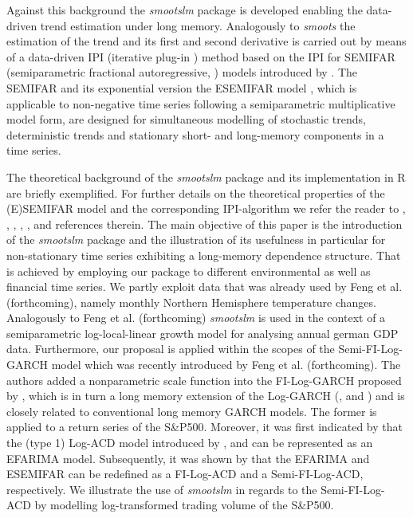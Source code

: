 \documentclass[12pt]{article}
\begin{document}
Against this background the \textit{smootslm} package is developed enabling the data-driven trend estimation under long memory. Analogously to \textit{smoots} the estimation of the trend and its first and second derivative is carried out by means of a data-driven IPI (iterative plug-in \cite{gasser1991flexible}) method based on the IPI for SEMIFAR (semiparametric fractional autoregressive, \cite{beran2002semifar}) models introduced by \citet{beran2002iterative}. The SEMIFAR and its exponential version the ESEMIFAR model \citep{beran2015modelling}, which is applicable to non-negative time series following a semiparametric multiplicative model form, are designed for simultaneous modelling of stochastic trends, deterministic trends and stationary short- and long-memory components in a time series.

The theoretical background of the \textit{smootslm} package and its implementation in R are briefly exemplified. For further details on the theoretical properties of the (E)SEMIFAR model and the corresponding IPI-algorithm we refer the reader to \citet{beran1999semifar}, \citet{beran2002semifar}, \citet{beran2002iterative}, \citet{beran2002local}, \citet{beran2015modelling}, \citet{beran2016long} and references therein. The main objective of this paper is the introduction of the \textit{smootslm} package and the illustration of its usefulness in particular for non-stationary time series exhibiting a long-memory dependence structure. That is achieved by employing our package to different environmental as well as financial time series. We partly exploit data that was already used by Feng et al. (forthcoming), namely monthly Northern Hemisphere temperature changes. Analogously to Feng et al. (forthcoming) \textit{smootslm} is used in the context of a semiparametric log-local-linear growth model for analysing annual german GDP data. Furthermore, our proposal is applied within the scopes of the Semi-FI-Log-GARCH model which was recently introduced by Feng et al. (forthcoming). The authors added a nonparametric scale function into the FI-Log-GARCH proposed by \citet{feng2020fractionally}, which is in turn a long memory extension of the Log-GARCH (\citet{pantula1986modeling}, \cite{geweke1986comment} and \cite{milhoj1987conditional}) and is closely related to conventional long memory GARCH models. The former is applied to a return series of the S\&P500. Moreover, it was first indicated by \citet{beran2015modelling} that the (type 1) Log-ACD model introduced by \citet{bauwens2000logarithmic}, \citet{bauwens2008moments} and \citet{karanasos2008statistical} can be represented as an EFARIMA model. Subsequently, it was shown by \citet{feng2015forecasting} that the EFARIMA and ESEMIFAR can be redefined as a FI-Log-ACD and a Semi-FI-Log-ACD, respectively. We illustrate the use of \textit{smootslm} in regards to the Semi-FI-Log-ACD by modelling log-transformed trading volume of the S\&P500.
\end{document}
